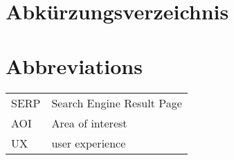 \ifmmtlanguagegerman
\section*{Abkürzungsverzeichnis}
\else
\section*{Abbreviations}
\fi

\begin{table}[h]		
	\begin{tabular}{ll}
		SERP & Search Engine Result Page \\
		AOI & Area of interest \\
		UX & user experience \\
	\end{tabular}
\end{table}
